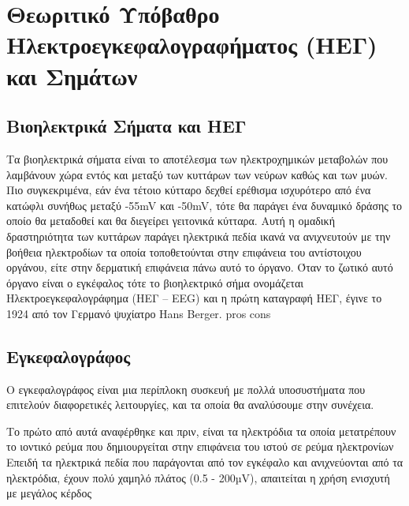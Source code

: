 \documentclass[11pt,a4paper,english,greek,twoside]{../Thesis}
\begin{document}
\chapter{Θεωριτικό Υπόβαθρο Ηλεκτροεγκεφαλογραφήματος (ΗΕΓ) και Σημάτων}
\section{Βιοηλεκτρικά Σήματα και ΗΕΓ}
Τα βιοηλεκτρικά σήματα είναι το αποτέλεσμα των ηλεκτροχημικών μεταβολών που λαμβάνουν χώρα εντός και μεταξύ των κυττάρων των νεύρων καθώς και των μυών. Πιο συγκεκριμένα, εάν ένα τέτοιο κύτταρο δεχθεί ερέθισμα ισχυρότερο από ένα κατώφλι συνήθως μεταξύ  -55mV και -50mV, τότε θα παράγει ένα δυναμικό δράσης το οποίο θα μεταδοθεί και θα διεγείρει γειτονικά κύτταρα. Αυτή η ομαδική δραστηριότητα των κυττάρων παράγει ηλεκτρικά πεδία ικανά να ανιχνευτούν με την βοήθεια ηλεκτροδίων τα οποία τοποθετούνται στην επιφάνεια του αντίστοιχου οργάνου, είτε στην δερματική επιφάνεια πάνω αυτό το όργανο. Όταν το ζωτικό αυτό όργανο είναι ο εγκέφαλος τότε το βιοηλεκτρικό σήμα ονομάζεται Hλεκτροεγκεφαλογράφημα (ΗΕΓ – EEG) και η πρώτη καταγραφή ΗΕΓ, έγινε το 1924 από τον Γερμανό ψυχίατρο Hans Berger. pros cons

\section{Εγκεφαλογράφος}
Ο εγκεφαλογράφος είναι μια περίπλοκη συσκευή με πολλά υποσυστήματα που επιτελούν διαφορετικές λειτουργίες, και τα οποία θα αναλύσουμε στην συνέχεια. \cite{Meng2011ABCI}

Το πρώτο από αυτά αναφέρθηκε και πριν, είναι τα ηλεκτρόδια τα οποία μετατρέπουν το ιοντικό ρεύμα που δημιουργείται στην επιφάνεια του ιστού σε ρεύμα ηλεκτρονίων
Επειδή τα ηλεκτρικά πεδία που παράγονται από τον εγκέφαλο και ανιχνεύονται από τα ηλεκτρόδια, έχουν πολύ χαμηλό πλάτος (0.5 - 200µV), απαιτείται η χρήση ενισχυτή με μεγάλος κέρδος
   
\end{document}
